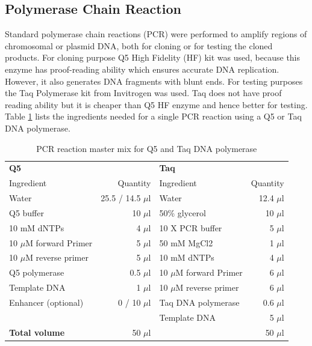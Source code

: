 		\subsection{Polymerase Chain Reaction}
		\label{sec:pcr}
		Standard polymerase chain reactions (PCR) were performed to amplify regions of chromosomal or plasmid DNA, both for cloning or for testing the cloned products. For cloning purpose Q5 High Fidelity (HF) kit was used, because this enzyme has proof-reading ability which ensures accurate DNA replication. However, it also generates DNA fragments with blunt ends.  For testing purposes the Taq Polymerase kit from Invitrogen was used. Taq does not have proof reading ability but it is cheaper than Q5 HF enzyme and hence better for testing. Table \ref{tab:q5andtaq} lists the ingredients needed for a single PCR reaction using a Q5 or Taq DNA polymerase. 
		
		\begin{table}[htbp]
		\caption{PCR reaction master mix for Q5 and Taq DNA polymerase}
		\begin{center}
		\begin{tabular}{lrlr}
			\toprule[2pt]
			\textbf{Q5 }               & \multicolumn{1}{l}{\textbf{}} & \textbf{Taq}               & \multicolumn{1}{l}{} \\
			Ingredient                 &                      Quantity & Ingredient                 &             Quantity \\ \midrule[1pt]
			Water                      &          25.5 / 14.5 $ \mu $l & Water                      &        12.4 $ \mu $l \\
			Q5 buffer                  &                   10 $ \mu $l & 50\% glycerol              &          10 $ \mu $l \\
			10 mM dNTPs                &                    4 $ \mu $l & 10 X PCR buffer            &           5 $ \mu $l \\
			10 $ \mu $M forward Primer &                    5 $ \mu $l & 50 mM MgCl2                &           1 $ \mu $l \\
			10 $ \mu $M reverse primer &                    5 $ \mu $l & 10 mM dNTPs                &           4 $ \mu $l \\
			Q5 polymerase              &                  0.5 $ \mu $l & 10 $ \mu $M forward Primer &           6 $ \mu $l \\
			Template DNA               &                    1 $ \mu $l & 10 $ \mu $M reverse primer &           6 $ \mu $l \\
			Enhancer (optional)        &               0 / 10 $ \mu $l & Taq DNA polymerase         &         0.6 $ \mu $l \\
			                           &          \multicolumn{1}{l}{} & Template DNA               &           5 $ \mu $l \\ \midrule[1pt]
			\textbf{Total volume}      &                   50 $ \mu $l & \multicolumn{1}{l}{}       &          50 $ \mu $l \\ \bottomrule[2pt]
		\end{tabular}
		\end{center}
		\label{tab:q5andtaq}
		\end{table}
		

